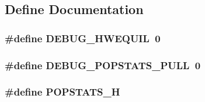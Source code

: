 \subsection{Define Documentation}
\hypertarget{popstats_8hh_ac6f1bc4d7682b5ee9dd2e5517f00e82e}{
\subsubsection[{DEBUG\_\-HWEQUIL}]{\setlength{\rightskip}{0pt plus 5cm}\#define DEBUG\_\-HWEQUIL~0}}
\label{popstats_8hh_ac6f1bc4d7682b5ee9dd2e5517f00e82e}
\hypertarget{popstats_8hh_a18a4c18a4e08244f3363161a13c363ed}{
\subsubsection[{DEBUG\_\-POPSTATS\_\-PULL}]{\setlength{\rightskip}{0pt plus 5cm}\#define DEBUG\_\-POPSTATS\_\-PULL~0}}
\label{popstats_8hh_a18a4c18a4e08244f3363161a13c363ed}
\hypertarget{popstats_8hh_aa9ff7a6aa31d770b2807ba4da745ade6}{
\subsubsection[{POPSTATS\_\-H}]{\setlength{\rightskip}{0pt plus 5cm}\#define POPSTATS\_\-H}}
\label{popstats_8hh_aa9ff7a6aa31d770b2807ba4da745ade6}

